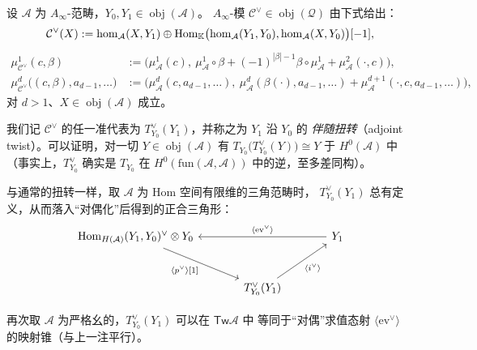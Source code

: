\begin{Def}\label{def:4.26}
设 $\mathcal A$ 为 $A_\infty$-范畴，$Y_0,Y_1\in\operatorname{obj}(\mathcal A)$。
$A_\infty$-模 $\mathcal C^\vee\in\operatorname{obj}(\mathcal Q)$ 由下式给出：
\[
  \mathcal C^\vee(X):=\hom_{\mathcal A}(X,Y_1)
  \oplus\operatorname{Hom}_{\mathbb K}\bigl(\hom_{\mathcal A}(Y_1,Y_0),
  \hom_{\mathcal A}(X,Y_0)\bigr)[-1],
\]
\[
  \begin{aligned}
    \mu^1_{\mathcal C^\vee}(c,\beta)
    &:=\bigl(\mu^1_{\mathcal A}(c),\
      \mu^1_{\mathcal A}\circ\beta+(-1)^{|\beta|-1}\beta\circ\mu^1_{\mathcal A}
      +\mu^2_{\mathcal A}(\cdot,c)\bigr),\\
    \mu^d_{\mathcal C^\vee}\bigl((c,\beta),a_{d-1},\dots\bigr)
    &:=\bigl(\mu^d_{\mathcal A}(c,a_{d-1},\dots),\
      \mu^d_{\mathcal A}(\beta(\cdot),a_{d-1},\dots)
      +\mu^{d+1}_{\mathcal A}(\cdot,c,a_{d-1},\dots)\bigr),
  \end{aligned}
\]
对 $d>1$、$X\in\operatorname{obj}(\mathcal A)$ 成立。
\end{Def}

我们记 $\mathcal C^\vee$ 的任一准代表为 $T^\vee_{Y_0}(Y_1)$，并称之为 $Y_1$ 沿 $Y_0$ 的
\emph{伴随扭转}（adjoint twist）。可以证明，对一切
$Y\in\operatorname{obj}(\mathcal A)$ 有 $T_{Y_0}\bigl(T^\vee_{Y_0}(Y)\bigr)\cong Y$ 于
$H^0(\mathcal A)$ 中（事实上，$T^\vee_{Y_0}$ 确实是 $T_{Y_0}$ 在
$H^0(\mathrm{fun}(\mathcal A,\mathcal A))$ 中的逆，至多差同构）。

与通常的扭转一样，取 $\mathcal A$ 为 Hom 空间有限维的三角范畴时，
$T^\vee_{Y_0}(Y_1)$ 总有定义，从而落入“对偶化”后得到的正合三角形：
\[
  \begin{tikzcd}[row sep=large, column sep=large]
    \Hom_{H(\mathcal A)}(Y_1,Y_0)^\vee\otimes Y_0
      \arrow[dr, "{\langle p^\vee\rangle{[}1{]}}"']
    & & Y_1 \arrow[ll, "{\langle\mathrm{ev}^\vee\rangle}"'] \\
    & T^\vee_{Y_0}(Y_1) \arrow[ur, "{\langle i^\vee\rangle}"'] &
  \end{tikzcd}
\]

再次取 $\mathcal A$ 为严格幺的，$T^\vee_{Y_0}(Y_1)$ 可以在 $\mathsf{Tw}\mathcal A$ 中
等同于“对偶”求值态射 $\langle\mathrm{ev}^\vee\rangle$ 的映射锥（与上一注平行）。

